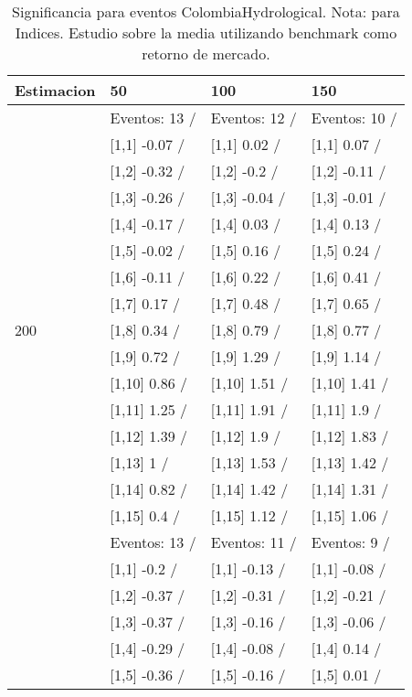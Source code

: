 \begin{table}

\caption{Significancia para eventos ColombiaHydrological. Nota: para Indices. Estudio sobre la media utilizando benchmark como retorno de mercado.}
\centering
\begin{tabular}[t]{llll}
\toprule
Estimacion & 50 & 100 & 150\\
\midrule
 & Eventos:  13 / & Eventos:  12 / & Eventos:  10 /\\
 & {}[1,1] -0.07  / & {}[1,1] 0.02  / & {}[1,1] 0.07  /\\
 & {}[1,2] -0.32  / & {}[1,2] -0.2  / & {}[1,2] -0.11  /\\
 & {}[1,3] -0.26  / & {}[1,3] -0.04  / & {}[1,3] -0.01  /\\
 & {}[1,4] -0.17  / & {}[1,4] 0.03  / & {}[1,4] 0.13  /\\
\addlinespace
 & {}[1,5] -0.02  / & {}[1,5] 0.16  / & {}[1,5] 0.24  /\\
 & {}[1,6] -0.11  / & {}[1,6] 0.22  / & {}[1,6] 0.41  /\\
 & {}[1,7] 0.17  / & {}[1,7] 0.48  / & {}[1,7] 0.65  /\\
200 & {}[1,8] 0.34  / & {}[1,8] 0.79  / & {}[1,8] 0.77  /\\
 & {}[1,9] 0.72  / & {}[1,9] 1.29  / & {}[1,9] 1.14  /\\
\addlinespace
 & {}[1,10] 0.86  / & {}[1,10] 1.51  / & {}[1,10] 1.41  /\\
 & {}[1,11] 1.25  / & {}[1,11] 1.91  / & {}[1,11] 1.9  /\\
 & {}[1,12] 1.39  / & {}[1,12] 1.9  / & {}[1,12] 1.83  /\\
 & {}[1,13] 1  / & {}[1,13] 1.53  / & {}[1,13] 1.42  /\\
 & {}[1,14] 0.82  / & {}[1,14] 1.42  / & {}[1,14] 1.31  /\\
\addlinespace
 & {}[1,15] 0.4  / & {}[1,15] 1.12  / & {}[1,15] 1.06  /\\
 & Eventos:  13 / & Eventos:  11 / & Eventos:  9 /\\
 & {}[1,1] -0.2  / & {}[1,1] -0.13  / & {}[1,1] -0.08  /\\
 & {}[1,2] -0.37  / & {}[1,2] -0.31  / & {}[1,2] -0.21  /\\
 & {}[1,3] -0.37  / & {}[1,3] -0.16  / & {}[1,3] -0.06  /\\
\addlinespace
 & {}[1,4] -0.29  / & {}[1,4] -0.08  / & {}[1,4] 0.14  /\\
 & {}[1,5] -0.36  / & {}[1,5] -0.16  / & {}[1,5] 0.01  /\\

\end{tabular}
\end{table}
